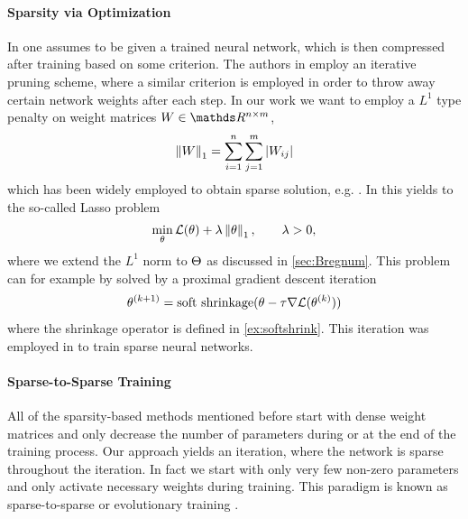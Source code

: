 \paragraph{Sparsity via Optimization} In \cite{lecun1989optimal, hassibi1993optimal} one assumes to be given a trained neural network, which is then compressed after training based on some criterion. The authors in \cite{castellano1997iterative} employ an iterative pruning scheme, where a similar criterion is employed in order to throw away certain network weights after each step. In our work we want to employ a $L^1$ type penalty on weight matrices $W\in\R^{n\times m}$,
%
\begin{align*}
	\left\|W\right\|_1 = \sum_{i=1}^n\sum_{j=1}^m \left|W_{ij}\right|
\end{align*}
%
which has been widely employed to obtain sparse solution, e.g. \cite{claerbout1973robust}. In \cite{tibshirani1996regression} this yields to the so-called Lasso problem
%
\begin{align*}
	\min_\theta \mathcal{L}(\theta) + \lambda \left\|\theta\right\|_1,\qquad \lambda >0,
\end{align*}
%
where we extend the $L^1$ norm to $\Theta$ as discussed in \cref{sec:Bregnum}. This problem can for example by solved by a proximal gradient descent iteration
%
\begin{align}\label{eq:proxgd}
	\theta^{(k+1)} = \operatorname{soft\ shrinkage}(\theta - \tau \nabla\mathcal{L}(\theta^{(k)}))
\end{align}
%
where the shrinkage operator is defined in \cref{ex:softshrink}. This iteration was employed in \cite{nitanda2014stochastic, rosasco2014convergence, reddi2016proximal} to train sparse neural networks.
%
%
\paragraph{Sparse-to-Sparse Training} All of the sparsity-based methods mentioned before start with dense weight matrices and only decrease the number of parameters during or at the end of the training process. Our approach yields an iteration, where the network is sparse throughout the iteration. In fact we start with only very few non-zero parameters and only activate necessary weights during training. This paradigm is known as sparse-to-sparse or evolutionary training \cite{mocanu2018scalable, dettmers2019sparse, Evci2020, dai2019nest, fu2019exploring, huang2016split, liu2021}.
%
%
